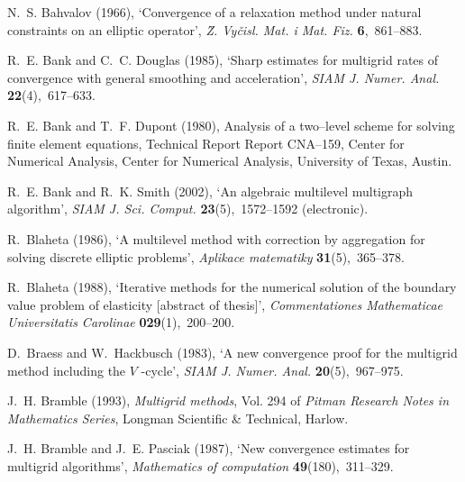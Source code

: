 \documentclass[12pt]{acta_2011xz}
\begin{document}
\begin{thebibliography}{xx}
N.~S. Bahvalov  (1966), `Convergence of a relaxation method under natural
  constraints on an elliptic operator', {\em \u Z. Vy\v cisl. Mat. i Mat. Fiz.}
  {\bf 6},~861--883.

R.~E. Bank and C.~C. Douglas  (1985), `Sharp estimates for multigrid rates of
  convergence with general smoothing and acceleration', {\em SIAM J. Numer.
  Anal.} {\bf 22}(4),~617--633.

R.~E. Bank and T.~F. Dupont  (1980), Analysis of a two--level scheme for
  solving finite element equations, Technical Report Report CNA--159, Center
  for Numerical Analysis, Center for Numerical Analysis, University of Texas,
  Austin.

R.~E. Bank and R.~K. Smith  (2002), `An algebraic multilevel multigraph
  algorithm', {\em SIAM J. Sci. Comput.} {\bf 23}(5),~1572--1592 (electronic).

R.~Blaheta  (1986), `{A multilevel method with correction by aggregation for
  solving discrete elliptic problems}', {\em Aplikace matematiky} {\bf
  31}(5),~365--378.

R.~Blaheta  (1988), `Iterative methods for the numerical solution of the
  boundary value problem of elasticity [abstract of thesis]', {\em
  Commentationes Mathematicae Universitatis Carolinae} {\bf 029}(1),~200--200.

D.~Braess and W.~Hackbusch  (1983), `A new convergence proof for the multigrid
  method including the {        $V$        }-cycle', {\em SIAM J. Numer. Anal.} {\bf
  20}(5),~967--975.

J.~H. Bramble  (1993), {\em Multigrid methods}, Vol. 294 of {\em Pitman
  Research Notes in Mathematics Series}, Longman Scientific  \&  Technical,
  Harlow.

J.~H. Bramble and J.~E. Pasciak  (1987), `New convergence estimates for
  multigrid algorithms', {\em Mathematics of computation} {\bf
  49}(180),~311--329.


\end{thebibliography}
\end{document}
